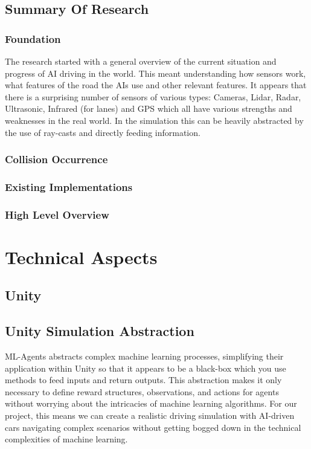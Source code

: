 \documentclass{article}
\begin{document}
\subsection{Summary Of Research}
\subsubsection{Foundation}
The research started with a general overview of the current situation and progress of AI driving in the world. This meant understanding how sensors work, what features of the road the AIs use and other relevant features. It appears that there is a surprising number of sensors of various types: Cameras, Lidar, Radar, Ultrasonic, Infrared (for lanes) and GPS \cite{General-overview-of-ai-driving} which all have various strengths and weaknesses in the real world. In the simulation this can be heavily abstracted by the use of ray-casts and directly feeding information.

\subsubsection{Collision Occurrence}
\lipsum[2][1]

\subsubsection{Existing Implementations}
\lipsum[2][1]

\subsubsection{High Level Overview}
\lipsum[2][1]

\section{Technical Aspects}
\lipsum[2][1]

\subsection{Unity}

\lipsum[2][1]

\subsection{Unity Simulation Abstraction}
ML-Agents abstracts complex machine learning processes, simplifying their application within Unity so that it appears to be a black-box which you use methods to feed inputs and return outputs. This abstraction makes it only necessary to define reward structures, observations, and actions for agents without worrying about the intricacies of machine learning algorithms. For our project, this means we can create a realistic driving simulation with AI-driven cars navigating complex scenarios without getting bogged down in the technical complexities of machine learning.
\end{document}
